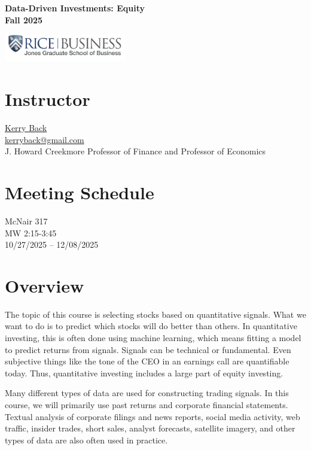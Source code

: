 \documentclass[11pt]{article}
\begin{document}
\begin{center}
{\LARGE\textbf{Data-Driven Investments: Equity\\Fall 2025}}

\vspace{1em}

\includegraphics[width=0.4\textwidth]{images/RiceBusiness-transparent-logo-sm.png}
\end{center}

\vspace{1em}

\section{Instructor}

\href{https://kerryback.com}{Kerry Back}\\
\href{mailto:kerryback@gmail.com}{kerryback@gmail.com}\\
J. Howard Creekmore Professor of Finance and Professor of Economics

\section{Meeting Schedule}

McNair 317\\
MW 2:15-3:45\\
10/27/2025 -- 12/08/2025

\section{Overview}

The topic of this course is selecting stocks based on quantitative signals. What we want to do is to predict which stocks will do better than others. In quantitative investing, this is often done using machine learning, which means fitting a model to predict returns from signals. Signals can be technical or fundamental. Even subjective things like the tone of the CEO in an earnings call are quantifiable today. Thus, quantitative investing includes a large part of equity investing.

Many different types of data are used for constructing trading signals. In this course, we will primarily use past returns and corporate financial statements. Textual analysis of corporate filings and news reports, social media activity, web traffic, insider trades, short sales, analyst forecasts, satellite imagery, and other types of data are also often used in practice.
\end{document}
